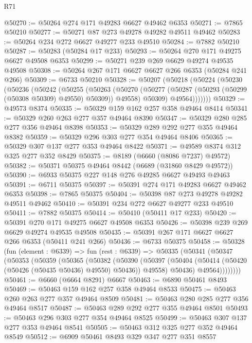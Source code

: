 \begin{lexlean}{R71}
\begin{coremodule}
@50270 := @50264 @274 @171 @49283 @6627 @49462 @6353
@50271 := @7865 @50210
@50277 := @50271 @87 @273 @49278 @49282 @49511 @49462
@50283 := @50264 @234 @272 @6627 @49277 @233 @49510
@50284 := @7882 @50210
@50287 := @50283 (@50284 @17 @233)
@50293 := @50264 @270 @171 @49275 @6627 @49508 @6353
@50299 := @50271 @239 @269 @6629 @49274 @49535 @49508
@50308 := @50264 @267 @171 @6627 @6627 @266 @6353 (@50284 @241 @266)
@50309 := @6733 @50210
@50328 := @50207
    (@50218
      (@50224
        (@50230
          (@50236
            (@50242
              (@50255
                (@50263
                  (@50270
                    (@50277 (@50287 (@50293 (@50299 (@50308 @50309) @49550) @50309)) @49558)
                    @50309)
                  @49564)))))))
@50329 := @49573 @8374
@50335 := @50329 @159 @162 @257 @358 @49464 @8414
@50341 := @50329 @260 @263 @277 @357 @49464 @8390
@50347 := @50329 @280 @285 @277 @356 @49464 @8398
@50353 := @50329 @289 @292 @277 @355 @49464 @8382
@50359 := @50329 @296 @303 @277 @354 @49464 @8406
@50365 := @50329 @307 @137 @277 @353 @49464 @8422
@50371 := @49589 @8374 @312 @325 @277 @352 @8429
@50375 := @8189 (@6660 (@8086 @7237) @49572)
@50382 := @50371 @50375 @49464 @8442 (@6689 (@31860 @8429 @49572))
@50390 := @6933 @50375 @227 @148 @276 @49285 @6627 @49493 @49463
@50391 := @6711 @50375
@50397 := @50391 @274 @171 @49283 @6627 @49462 @6353
@50398 := @7865 @50375
@50404 := @50398 @87 @273 @49278 @49282 @49511 @49462
@50410 := @50391 @234 @272 @6627 @49277 @233 @49510
@50411 := @7882 @50375
@50414 := @50410 (@50411 @17 @233)
@50420 := @50391 @270 @171 @49275 @6627 @49508 @6353
@50426 := @50398 @239 @269 @6629 @49274 @49535 @49508
@50435 := @50391 @267 @171 @6627 @6627 @266 @6353 (@50411 @241 @266)
@50436 := @6733 @50375
@50458 := @50328
    (fun (element : @6339) =>
    fun (rest : @6339) =>
    @50335
      (@50341
        (@50347
          (@50353
            (@50359
              (@50365
                (@50382
                  (@50390
                    (@50397
                      (@50404 (@50414 (@50420 (@50426 (@50435 @50436) @49550) @50436)) @49558)
                      @50436)
                    @49564))))))))
@50461 := @6660 (@6664 @8291) @6667
@50463 := @6890 @50461 @8493
@50469 := @50463 @159 @162 @257 @358 @49464 @8533
@50475 := @50463 @260 @263 @277 @357 @49464 @8509
@50481 := @50463 @280 @285 @277 @356 @49464 @8517
@50487 := @50463 @289 @292 @277 @355 @49464 @8501
@50493 := @50463 @296 @303 @277 @354 @49464 @8525
@50499 := @50463 @307 @137 @277 @353 @49464 @8541
@50505 := @50463 @312 @325 @277 @352 @49464 @8549
@50512 := @6909 @50461 @8493 @329 @347 @277 @351 @8557

\end{coremodule}
\end{lexlean}
